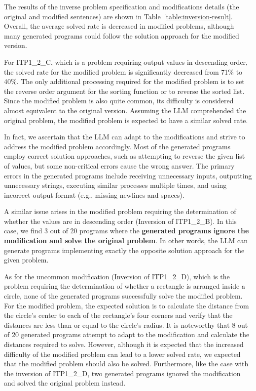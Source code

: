 \documentclass{article}
\begin{document}
The results of the inverse problem specification and modifications details (the original and modified sentences) are shown in Table~\ref{table:inversion-result}.
Overall, the average solved rate is decreased in modified problems, although many generated programs could follow the solution approach for the modified version.


For ITP1\_2\_C, which is a problem requiring output values in descending order, the solved rate for the modified problem is significantly decreased from 71\% to 40\%.
The only additional processing required for the modified problem is to set the reverse order argument for the sorting function or to reverse the sorted list.
Since the modified problem is also quite common, its difficulty is considered almost equivalent to the original version.
Assuming the LLM comprehended the original problem, the modified problem is expected to have a similar solved rate.

In fact, we ascertain that the LLM can adapt to the modifications and strive to address the modified problem accordingly.
Most of the generated programs employ correct solution approaches, such as attempting to reverse the given list of values, but some non-critical errors cause the wrong answer.
The primary errors in the generated programs include receiving unnecessary inputs, outputting unnecessary strings, executing similar processes multiple times, and using incorrect output format (e.g., missing newlines and spaces).

A similar issue arises in the modified problem requiring the determination of whether the values are in descending order (Inversion of ITP1\_2\_B).
In this case, we find 3 out of 20 programs where the \textbf{generated programs ignore the modification and solve the original problem}.
In other words, the LLM can generate programs implementing exactly the opposite solution approach for the given problem.


As for the uncommon modification (Inversion of ITP1\_2\_D), which is the problem requiring the determination of whether a rectangle is arranged inside a circle, none of the generated programs successfully solve the modified problem.
For the modified problem, the expected solution is to calculate the distance from the circle's center to each of the rectangle's four corners and verify that the distances are less than or equal to the circle's radius.
It is noteworthy that 8 out of 20 generated programs attempt to adapt to the modification and calculate the distances required to solve.
However, although it is expected that the increased difficulty of the modified problem can lead to a lower solved rate, we expected that the modified problem should also be solved.
Furthermore, like the case with the inversion of ITP1\_2\_D, two generated programs ignored the modification and solved the original problem instead.
\end{document}
